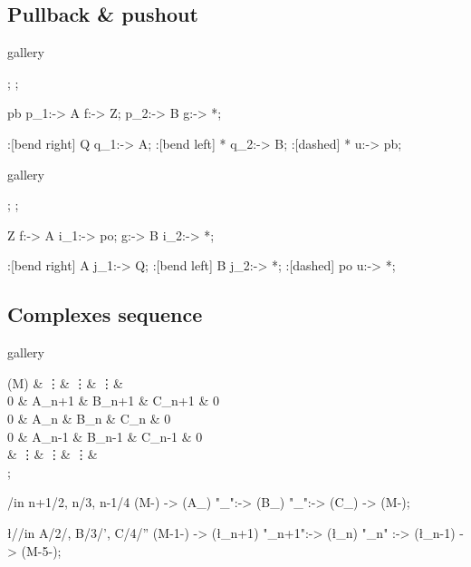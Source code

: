 \clearpage

\subsection{Pullback \& pushout}

\begin{tcblisting}{gallery}
\begin{kodi}[hexagonal]
  ;
  ;

  \mor[swap] pb p_1:-> A f:-> Z;
  \mor        * p_2:-> B g:-> *;

  \mor[swap]:[bend right] Q q_1:-> A;
  \mor      :[bend left]  * q_2:-> B;
  \mor [mid]:[dashed]     *   u:-> pb;
\end{kodi}
\end{tcblisting}

\begin{tcblisting}{gallery}
\begin{kodi}[hexagonal]
  ;
  ;

  \mor[swap] Z f:-> A i_1:-> po;
  \mor       * g:-> B i_2:-> *;

  \mor[swap]:[bend right]  A j_1:-> Q;
  \mor      :[bend left]   B j_2:-> *;
  \mor [mid]:[dashed]     po   u:-> *;
\end{kodi}
\end{tcblisting}

\clearpage

\subsection{Complexes sequence}

\begin{tcblisting}{gallery}
\begin{kodi}
  \obj (M) {   & \vdots  & \vdots  & \vdots  &   \\
             0 & A_{n+1} & B_{n+1} & C_{n+1} & 0 \\
             0 & A_{n}   & B_{n}   & C_{n}   & 0 \\
             0 & A_{n-1} & B_{n-1} & C_{n-1} & 0 \\
               & \vdots  & \vdots  & \vdots  &   \\ };

  \foreach \n/\row in {n+1/2, n/3, n-1/4}
    \mor (M-) -> (A_{\n}) "\alpha_{\n}":-> (B_{\n})
                                 "\beta_{\n}":-> (C_{\n}) -> (M-);

  \foreach \l/\col/\q in {A/2/, B/3/', C/4/''}
    \mor (M-1-\col) -> (\l_{n+1}) "\partial\q_{n+1}":-> (\l_{n})
                                  "\partial\q_{n}"  :-> (\l_{n-1}) -> (M-5-\col);
\end{kodi}
\end{tcblisting}

